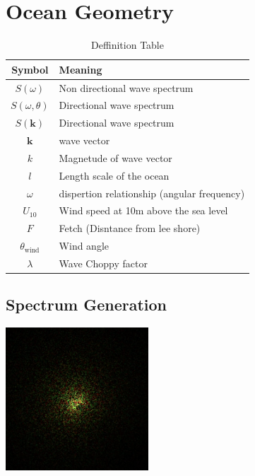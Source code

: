 \section{Ocean Geometry}
\begin{table}[H]
    \centering
    \begin{tabular}{cl}
        \toprule
        \textbf{Symbol} & \textbf{Meaning} \\
        \midrule
        $S(\omega)$ & Non directional wave spectrum \\
        $S(\omega, \theta)$ & Directional wave spectrum\\
        $S(\mathbf{k})$ & Directional wave spectrum\\
        $\mathbf{k}$ & wave vector \\
        $k$ & Magnetude of wave vector\\
        $l$ & Length scale of the ocean\\
        $\omega$ & dispertion relationship (angular frequency)\\
        $U_{10}$ & Wind speed at 10m above the sea level\\
        $F$ & Fetch (Disntance from lee shore)\\
        $\theta_{\text{wind}}$ & Wind angle\\
        $\lambda$ & Wave Choppy factor\\
        \bottomrule
    \end{tabular}
    \caption{Deffinition Table}
    \label{table:deffinition_table}
\end{table}

\subsection{Spectrum Generation}

\begin{minipage}{1\textwidth}
    \centering
    \includegraphics[width=0.40\textwidth]{"images/tma_spectrum.png"}
    \label{fig:tma_spectrum}
\end{minipage}
\vspace{0cm}


